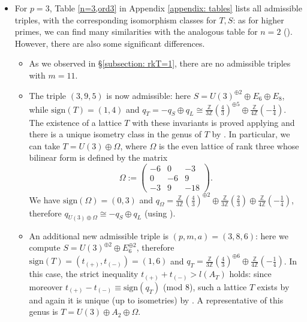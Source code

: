 \documentclass{amsart}
\theoremstyle{definition}
\newcommand{\IZ}{\mathbb{Z}}
\newcommand{\coloneqq}{:=}
\newcommand{\sign}{\mathrm{sign}}
\begin{document}
\begin{itemize}
\item For $p=3$, Table \ref{n=3,ord3} in Appendix \ref{appendix: tables} lists all admissible triples, with the corresponding isomorphism classes for $T,S$: as for higher primes, we can find many similarities with the analogous table for $n=2$ (\cite[Table 1]{bcs}). However, there are also some significant differences.
\begin{itemize}
\item As we observed in \S \ref{subsection: rkT=1}, there are no admissible triples with $m=11$.
\item The triple $(3,9,5)$ is now admissible: here $S= U(3)^{\oplus 2} \oplus E_6 \oplus E_8$, while $\sign(T)=(1,4)$ and $q_T = -q_S \oplus q_L \cong \frac{\IZ}{3 \IZ}\left( \frac{4}{3}\right)^{\oplus 5} \oplus  \frac{\IZ}{4 \IZ} \left( -\frac{1}{4}\right)$. The existence of a lattice $T$ with these invariants is proved applying \cite[Theorem 1.10.1]{nikulin} and there is a unique isometry class in the genus of $T$ by \cite[Chapter 15, Theorem 21]{conway_sloane}. In particular, we can take $T = U(3) \oplus \Omega$, where $\Omega$ is the even lattice of rank three whose bilinear form is defined by the matrix
\[ \Omega \coloneqq \begin{pmatrix}
-6 & 0 & -3\\
0 & -6 & 9\\
-3 & 9 & -18
\end{pmatrix}.\]
We have $\sign(\Omega) = (0,3)$ and $q_\Omega = \frac{\IZ}{3 \IZ}\left( \frac{4}{3}\right)^{\oplus 2} \oplus \frac{\IZ}{3 \IZ}\left( \frac{2}{3}\right) \oplus  \frac{\IZ}{4 \IZ} \left( -\frac{1}{4}\right)$, therefore $q_{U(3) \oplus \Omega} \cong -q_S \oplus q_L$ (using \cite[Proposition 1.8.2]{nikulin}).
\item An additional new admissible triple is $(p,m,a)=(3,8,6)$: here we compute $S = U(3)^{\oplus 2} \oplus E_6^{\oplus 2}$, therefore $\sign(T)=(t_{(+)},t_{(-)})=(1,6)$ and $q_T = \frac{\IZ}{3 \IZ}\left( \frac{4}{3}\right)^{\oplus 6} \oplus  \frac{\IZ}{4 \IZ} \left( -\frac{1}{4}\right)$. In this case, the strict inequality \mbox{$t_{(+)} + t_{(-)} > l(A_T)$} holds: since moreover $t_{(+)} - t_{(-)} \equiv \sign(q_T)$ (mod $8$), such a lattice $T$ exists by \cite[Corollary 1.10.2]{nikulin} and again it is unique (up to isometries) by \cite[Chapter 15, Theorem 21]{conway_sloane}. A representative of this genus is $T = U(3) \oplus A_2 \oplus \Omega$. 
\end{itemize}
\end{itemize}
\end{document}
